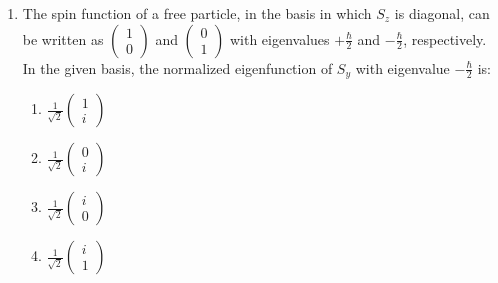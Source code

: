 \documentclass[journal]{IEEEtran}
\begin{document}
\begin{enumerate}[start=37]
\begin{multicols}{4}
\begin{enumerate}
\item $P_{x}, P_{z}, L_{z}$
\item $P_{x}, P_{y}, L_{z}, E$
\item $P_{y}, L_{z}, E$
\item $P_{y}, P_{z}, L_{x}, E$
\end{enumerate} 
\end{multicols}
\item The spin function of a free particle, in the basis in which $ S_{z} $ is diagonal, can be written as $ \begin{pmatrix} 1 \\ 0 \end{pmatrix} $ and $ \begin{pmatrix} 0 \\ 1 \end{pmatrix} $ with eigenvalues $ +\frac{\hbar}{2} $ and $ -\frac{\hbar}{2} $, respectively. In the given basis, the normalized eigenfunction of $ S_{y} $ with eigenvalue $ -\frac{\hbar}{2} $ is:
\begin{multicols}{4}
\begin{enumerate}
\item $  \frac{1}{\sqrt{2}}\begin{pmatrix} 1 \\ i \end{pmatrix}$ 
\item $  \frac{1}{\sqrt{2}}\begin{pmatrix} 0 \\ i \end{pmatrix}$ 
\item $  \frac{1}{\sqrt{2}}\begin{pmatrix} i \\ 0 \end{pmatrix} $
\item $  \frac{1}{\sqrt{2}}\begin{pmatrix} i \\ 1 \end{pmatrix}$
\end{enumerate}
\end{multicols}


\end{enumerate}
\end{document}
